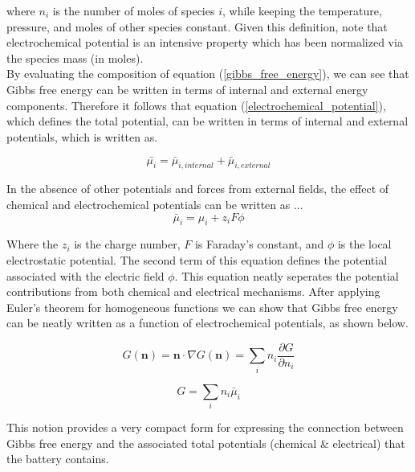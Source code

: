 \documentclass[lettersize,journal]{IEEEtran}
\begin{document}
 \noindent where $n_i$ is the number of moles of species $i$, while keeping the temperature, pressure, and moles of other species constant.  Given this definition, note that electrochemical potential is an intensive property which has been normalized via the species mass (in moles).\\

 By evaluating the composition of equation (\ref{gibbs_free_energy}), we can see that Gibbs free energy can be written in terms of internal and external energy components. Therefore it follows that equation (\ref{electrochemical_potential}), which defines the total potential, can be written in terms of internal and external potentials, which is written as.

\begin{equation}
  \bar{\mu_{i}} = \bar{\mu}_{i, internal} + \bar{\mu}_{i, external}
\end{equation}

 In the absence of other potentials and forces from external fields, the effect of chemical and electrochemical potentials can be written as ...
 \begin{equation}\label{total_potential}
   \bar{\mu}_{i} = \mu_{i} + z_i F \phi
 \end{equation}

Where the $z_i$ is the charge number, $F$ is Faraday's constant, and $\phi$ is the local electrostatic potential. The second term of this equation defines the potential associated with the electric field $\phi$. This equation neatly seperates the potential contributions from both chemical and electrical mechanisms. After applying Euler's theorem for homogeneous functions we can show that Gibbs free energy can be neatly written as a function of electrochemical potentials, as shown below.

\begin{equation}
  G(\textbf{n}) = \textbf{n} \cdot \nabla G (\textbf{n}) = \sum_i n_i \frac{\partial G}{\partial n_i}
\end{equation}

\begin{equation}\label{gibbs_summation}
  G = \sum_i n_i \bar{\mu}_i
\end{equation}

\noindent This notion provides a very compact form for expressing the connection between Gibbs free energy and the associated total potentials (chemical \& electrical) that the battery contains.  \\
\end{document}
